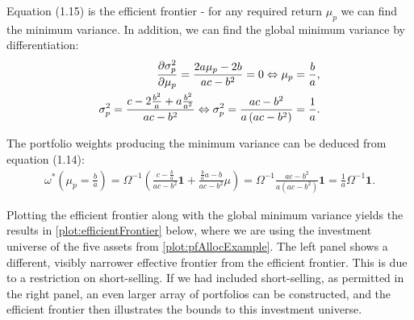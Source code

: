 \documentclass[11pt,a4paper,oneside]{article}
\newcommand{\LL}{\Leftrightarrow}
\newcommand{\lp}{\left(}
\newcommand{\rp}{\right)}
\begin{document}
Equation (1.15) is the efficient frontier - for any required return $\mu_p$ we can find the minimum variance. In addition, we can find the global minimum variance by differentiation:
\begin{align}
    \frac{\partial \sigma_p^2}{\partial \mu_p} = \frac{2a\mu_p - 2b}{ac - b^2} = 0\LL \mu_p = \frac{b}{a}, \notag\\
    \sigma_p^2 = \frac{c - 2 \frac{b^2}{a} + a \frac{b^2}{a^2}}{ac - b^2} \LL \sigma_p^2 = \frac{ac - b^2}{a\lp ac - b^2\rp} = \frac{1}{a}.
\end{align}

The portfolio weights producing the minimum variance can be deduced from equation (1.14):
\begin{align}
    \omega^*\lp \mu_p = \frac{b}{a}\rp = \Omega^{-1}\lp \frac{c - \frac{b}{a}}{ac - b^2} \mathbf{1} + \frac{\frac{b}{a} a - b}{ac - b^2} \mu\rp = \Omega^{-1} \frac{ac - b^2}{a\lp ac - b^2\rp}\mathbf{1} = \frac{1}{a}\Omega^{-1} \mathbf{1}.
\end{align}

Plotting the efficient frontier along with the global minimum variance yields the results in \ref{plot:efficientFrontier} below, where we are using the investment universe of the five assets from \ref{plot:pfAllocExample}. The left panel shows a different, visibly narrower effective frontier from the efficient frontier. This is due to a restriction on short-selling. If we had included short-selling, as permitted in the right panel, an even larger array of portfolios can be constructed, and the efficient frontier then illustrates the bounds to this investment universe.
\end{document}
